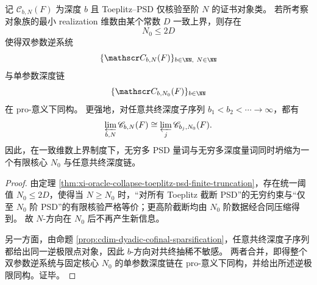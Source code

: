 \begin{theorem}[一致维数上界下的有限核心坍缩]\label{thm:conclusion-finite-core-collapse-uniform-dimension}
记 \(\mathscr C_{b,N}(F)\) 为深度 \(b\) 且 Toeplitz--PSD 仅核验至阶 \(N\) 的证书对象类。
若所考察对象族的最小 realization 维数由某个常数 \(D\) 一致上界，则存在
\[
N_0\le 2D
\]
使得双参数逆系统
\[
\{\mathscr C_{b,N}(F)\}_{b\in\NN,\ N\in\NN}
\]
与单参数深度链
\[
\{\mathscr C_{b,N_0}(F)\}_{b\in\NN}
\]
在 pro-意义下同构。
更强地，对任意共终深度子序列 \(b_1<b_2<\cdots\to\infty\)，都有
\[
\varprojlim_{b,N}\mathscr C_{b,N}(F)
\cong
\varprojlim_{j}\mathscr C_{b_j,N_0}(F).
\]
因此，在一致维数上界制度下，无穷多 PSD 量词与无穷多深度量词同时坍缩为一个有限核心 \(N_0\) 与任意共终深度链。
\end{theorem}
\begin{proof}
由定理 \ref{thm:xi-oracle-collapse-toeplitz-psd-finite-truncation}，存在统一阈值 \(N_0\le 2D\)，使得当 \(N\ge N_0\) 时，“对所有 Toeplitz 截断 PSD”的无穷约束与“仅至 \(N_0\) 阶 PSD”的有限核验严格等价；更高阶截断均由 \(N_0\) 阶数据经合同压缩得到。
故 \(N\)-方向在 \(N_0\) 后不再产生新信息。

另一方面，由命题 \ref{prop:cdim-dyadic-cofinal-sparsification}，任意共终深度子序列都给出同一逆极限点对象，因此 \(b\)-方向对共终抽稀不敏感。
两者合并，即得整个双参数逆系统与固定核心 \(N_0\) 的单参数深度链在 pro-意义下同构，并给出所述逆极限同构。证毕。
\end{proof}

